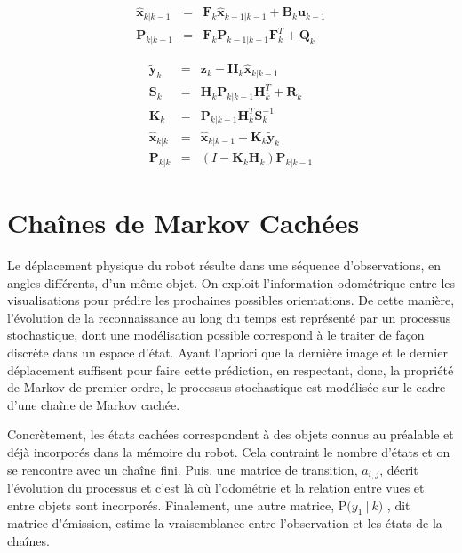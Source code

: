 \begin{equation*}
	\begin{array}{ccl}
		\hat{\textbf{x}}_{k|k-1} &=& \textbf{F}_{k}\hat{\textbf{x}}_{k-1|k-1} + \textbf{B}_{k} \textbf{u}_{k-1}\\
		\textbf{P}_{k|k-1} &=& \textbf{F}_{k} \textbf{P}_{k-1|k-1} \textbf{F}_{k}^{T} + \textbf{Q}_{k}
	\end{array}
\end{equation*}

\begin{equation*}
	\begin{array}{ccl}
\tilde{\textbf{y}}_{k} &=& \textbf{z}_{k} - \textbf{H}_{k}\hat{\textbf{x}}_{k|k-1} \\
\textbf{S}_{k} &=& \textbf{H}_{k}\textbf{P}_{k|k-1} \textbf{H}_{k}^{T}+\textbf{R}_{k} \\
\textbf{K}_{k} &=& \textbf{P}_{k|k-1}\textbf{H}_{k}^{T}\textbf{S}_{k}^{-1} \\
\hat{\textbf{x}}_{k|k} &=& \hat{\textbf{x}}_{k|k-1} + \textbf{K}_{k}\tilde{\textbf{y}}_{k} \\
\textbf{P}_{k|k} &=& (I - \textbf{K}_{k} \textbf{H}_{k}) \textbf{P}_{k|k-1}
	\end{array}
\end{equation*}

\section {Chaînes de Markov Cachées}

Le déplacement physique du robot résulte dans une séquence
d'observations, en angles différents, d'un même objet. On exploit
l'information odométrique entre les visualisations pour prédire les
prochaines possibles orientations. De cette manière, l'évolution de la
reconnaissance au long du temps est représenté par un processus
stochastique, dont une modélisation possible correspond à le traiter
de façon discrète dans un espace d'état. Ayant l'apriori que la
dernière image et le dernier déplacement suffisent pour faire cette
prédiction, en respectant, donc, la propriété de Markov de premier
ordre, le processus stochastique est modélisée sur le cadre d'une
chaîne de Markov cachée.

Concrètement, les états cachées correspondent à des objets connus au
préalable et déjà incorporés dans la mémoire du robot. Cela contraint le
nombre d'états et on se rencontre avec un chaîne fini. Puis, une
matrice de transition, $a_{i,j}$, décrit l'évolution du processus et c'est là où
l'odométrie et la relation entre vues et entre objets sont
incorporés. Finalement, une autre matrice, $\mathrm{P}\big( y_1 \ | \ k \big)$
, dit matrice d'émission, estime la vraisemblance entre l'observation
et les états de la chaînes.

